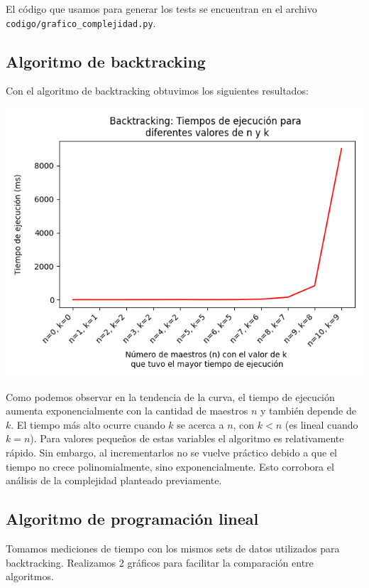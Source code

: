\documentclass{article}
\begin{document}
El código que usamos para generar los tests se encuentran en el archivo 
\texttt{codigo/grafico\_complejidad.py}.

\subsection{Algoritmo de backtracking}
Con el algoritmo de backtracking obtuvimos los siguientes resultados:

\includegraphics[scale=0.60]{images/graficoBacktrackingGreedy.png}

Como podemos observar en la tendencia de la curva, el tiempo de ejecución aumenta exponencialmente con la cantidad de maestros $n$ y también depende de $k$. El tiempo más alto ocurre cuando $k$ se acerca a $n$, con $k < n$ (es lineal cuando $k = n$). Para valores pequeños de estas variables el algoritmo es relativamente rápido. Sin embargo, al incrementarlos no se vuelve práctico debido a que el tiempo no crece polinomialmente, sino exponencialmente.  Esto corrobora el análisis de la complejidad planteado previamente.

\subsection{Algoritmo de programación lineal}

Tomamos mediciones de tiempo con los mismos sets de datos utilizados para backtracking. Realizamos 2 gráficos para facilitar la comparación entre algoritmos. 
\end{document}
